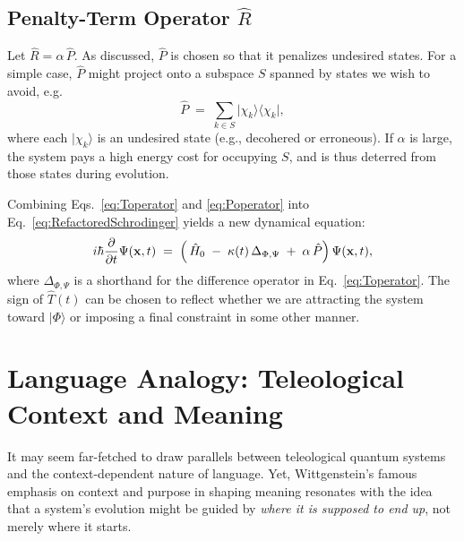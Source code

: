 \documentclass[11pt]{article}
\begin{document}
\subsection{Penalty-Term Operator $\hat{R}$}
Let $\hat{R} = \alpha\,\hat{P}$. As discussed, $\hat{P}$ is chosen so that it penalizes undesired states. For a simple case, $\hat{P}$ might project onto a subspace $S$ spanned by states we wish to avoid, e.g.\
\begin{equation}
\label{eq:Poperator}
\hat{P} \;=\; \sum_{k \in S} \vert \chi_k\rangle \langle \chi_k \vert,
\end{equation}
where each $\vert \chi_k\rangle$ is an undesired state (e.g., decohered or erroneous). If $\alpha$ is large, the system pays a high energy cost for occupying $S$, and is thus deterred from those states during evolution. 

Combining Eqs.~\eqref{eq:Toperator} and \eqref{eq:Poperator} into Eq.~\eqref{eq:RefactoredSchrodinger} yields a new dynamical equation:
\begin{equation}
\label{eq:FinalRefactored}
i\hbar \frac{\partial}{\partial t}\Psi(\mathbf{x}, t) 
\;=\; \Bigl(\,\hat{H}_0 \;-\; \kappa(t)\,\Delta_{\Phi,\Psi} \;+\; \alpha \,\hat{P}\Bigr)\,\Psi(\mathbf{x}, t),
\end{equation}
where $\Delta_{\Phi,\Psi}$ is a shorthand for the difference operator in Eq.~\eqref{eq:Toperator}. The sign of $\hat{T}(t)$ can be chosen to reflect whether we are attracting the system toward $\vert\Phi\rangle$ or imposing a final constraint in some other manner.

\section{Language Analogy: Teleological Context and Meaning}
\label{sec:language-analogy}
It may seem far-fetched to draw parallels between teleological quantum systems and the context-dependent nature of language. Yet, Wittgenstein’s famous emphasis on context and purpose in shaping meaning resonates with the idea that a system’s evolution might be guided by \emph{where it is supposed to end up}, not merely where it starts.
\end{document}
